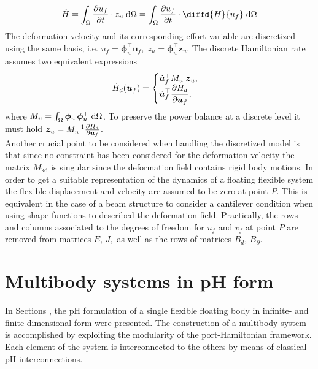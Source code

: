 \[
\dot{H} = \int_{\Omega} \diffp{u_f}{t} \cdot z_{u} \d{\Omega} = \int_{\Omega} \diffp{u_f}{t} \cdot \diffd{H}{u_f} \d{\Omega}
\]
The deformation velocity and its corresponding effort variable are discretized using the same basis, i.e. $u_f = \bm{\phi}_u^\top \bm{u}_f, \; z_u = \bm{\phi}_u^\top \bm{z}_u$. The discrete Hamiltonian rate assumes two equivalent expressions
\begin{equation*}
\dot{H}_d(\bm{u}_f) = 
\begin{cases}
\dot{\bm{u}}_f^\top {M}_u \; \bm{z}_u, \\
\displaystyle \dot{\bm{u}}_f^\top \diffp{H_d}{\bm{u}_f},
\end{cases}
\end{equation*}
where ${M}_u=\int_{\Omega} \bm{\phi}_u \, \bm{\phi}_u^\top \d{\Omega}$. To preserve the power balance at a discrete level it must hold $ \bm{z}_u = {M}_u^{-1} \diffp{H_d}{\bm{u}_f}$. \\

Another crucial point to be considered when handling the discretized model is that since no constraint has been considered for the deformation velocity the matrix ${M}_{\text{kd}}$ is singular since the deformation field contains rigid body motions. In order to get a suitable representation of the dynamics of a floating flexible system the flexible displacement and velocity are assumed to be zero at point $P$. This is equivalent in the case of a beam structure to consider a cantilever condition when using shape functions to described the deformation field. Practically, the rows and columns associated to the degrees of freedom for $u_f$ and $v_f$ at point $P$ are removed from matrices ${E}, \, {J},$ as well as the rows of matrices ${B}_d, \, {B}_\partial$.


\section{Multibody systems in pH form}
In Sections ,  the pH formulation of a single flexible floating body in infinite- and finite-dimensional form were presented. The construction of a multibody system is accomplished by exploiting the modularity of the port-Hamiltonian framework. Each element of the system is interconnected to the others by means of classical pH interconnections.

